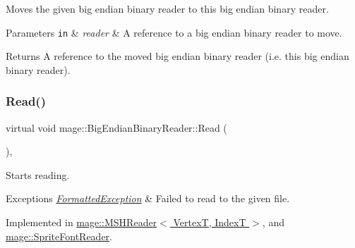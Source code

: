 Moves the given big endian binary reader to this big endian binary reader.


\begin{DoxyParams}[1]{Parameters}
\mbox{\tt in}  & {\em reader} & A reference to a big endian binary reader to move. \\
\hline
\end{DoxyParams}
\begin{DoxyReturn}{Returns}
A reference to the moved big endian binary reader (i.\+e. this big endian binary reader). 
\end{DoxyReturn}
\hypertarget{classmage_1_1_big_endian_binary_reader_af072965dea0319d6366b21cc6562bbf9}{}\label{classmage_1_1_big_endian_binary_reader_af072965dea0319d6366b21cc6562bbf9} 
\subsubsection{\texorpdfstring{Read()}{Read()}}
{\footnotesize\ttfamily virtual void mage\+::\+Big\+Endian\+Binary\+Reader\+::\+Read (\begin{DoxyParamCaption}{ }\end{DoxyParamCaption})\hspace{0.3cm}{\ttfamily [private]}, {}}

Starts reading.


\begin{DoxyExceptions}{Exceptions}
{\em \hyperlink{classmage_1_1_formatted_exception}{Formatted\+Exception}} & Failed to read to the given file. \\
\hline
\end{DoxyExceptions}


Implemented in \hyperlink{classmage_1_1_m_s_h_reader_a26b60060bf61183fb5758a4725c6a205}{mage\+::\+M\+S\+H\+Reader$<$ Vertex\+T, Index\+T $>$}, and \hyperlink{classmage_1_1_sprite_font_reader_af380ae127285a88ae41e35a9067db412}{mage\+::\+Sprite\+Font\+Reader}.

\hypertarget{classmage_1_1_big_endian_binary_reader_aec453e82d9b318e04894d4168db23715}{}\label{classmage_1_1_big_endian_binary_reader_aec453e82d9b318e04894d4168db23715} 

